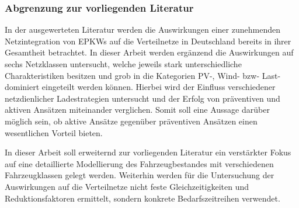 \subsubsection{Abgrenzung zur vorliegenden Literatur}

In der ausgewerteten Literatur werden die Auswirkungen einer zunehmenden Netzintegration von \glspl{EPKW} auf die Verteilnetze in Deutschland bereits in ihrer Gesamtheit betrachtet.
In dieser Arbeit werden ergänzend die Auswirkungen auf sechs Netzklassen untersucht, welche jeweils stark unterschiedliche Charakteristiken besitzen und grob in die Kategorien \gls{PV}-, Wind- bzw- Last-dominiert eingeteilt werden können.
Hierbei wird der Einfluss verschiedener netzdienlicher Ladestrategien untersucht und der Erfolg von präventiven und aktiven Ansätzen miteinander verglichen.
Somit soll eine Aussage darüber möglich sein, ob aktive Ansätze gegenüber präventiven Ansätzen einen wesentlichen Vorteil bieten.\medskip

In dieser Arbeit soll erweiternd zur vorliegenden Literatur ein verstärkter Fokus auf eine detaillierte Modellierung des Fahrzeugbestandes mit verschiedenen Fahrzeugklassen gelegt werden.
Weiterhin werden für die Untersuchung der Auswirkungen auf die Verteilnetze nicht feste Gleichzeitigkeiten und Reduktionsfaktoren ermittelt, sondern konkrete Bedarfszeitreihen verwendet.


\clearpage
